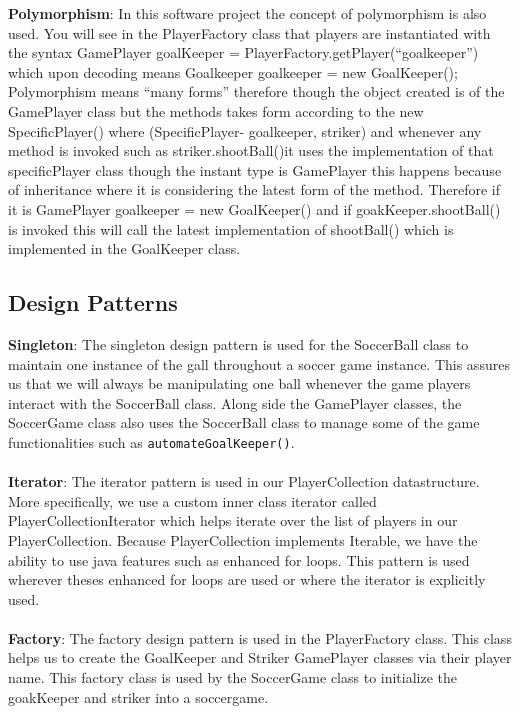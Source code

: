 \documentclass[12pt, dvipsnames, a4paper]{article}
\newcommand{\code}[1]{\texttt{#1}}
\begin{document}
\textbf{Polymorphism}: In this software project the concept of polymorphism is also used. You will see in the PlayerFactory class that
players are instantiated with the syntax GamePlayer goalKeeper = PlayerFactory.getPlayer(“goalkeeper”) which upon decoding means Goalkeeper goalkeeper = new GoalKeeper();
Polymorphism means “many forms” therefore though the object created is of the GamePlayer class but the methods takes form according to the
new SpecificPlayer() where (SpecificPlayer- goalkeeper, striker) and whenever any method is invoked such as striker.shootBall()it uses the implementation
of that specificPlayer class though the instant type is GamePlayer this happens because of inheritance where it is considering the latest form of the method.
Therefore if it is GamePlayer goalkeeper =  new GoalKeeper() and if goakKeeper.shootBall() is invoked this will call the
latest implementation of shootBall() which is implemented in the GoalKeeper class.

\subsection{Design Patterns}
\textbf{Singleton}: The singleton design pattern is used for the SoccerBall class to maintain one instance of the
gall throughout a soccer game instance. This assures us that we will always be manipulating one ball
whenever the game players interact with the SoccerBall class. Along side the GamePlayer classes, the SoccerGame class
also uses the SoccerBall class to manage some of the game functionalities such as \code{automateGoalKeeper()}. \\ \\
\textbf{Iterator}: The iterator pattern is used in our PlayerCollection datastructure. More specifically, we use a custom inner class
iterator called PlayerCollectionIterator which helps iterate over the list of players in our PlayerCollection. Because PlayerCollection
implements Iterable, we have the ability to use java features such as enhanced for loops. This
pattern is used wherever theses enhanced for loops are used or where the iterator is explicitly used. \\ \\
\textbf{Factory}: The factory design pattern is used in the PlayerFactory class. This class
helps us to create the GoalKeeper and Striker GamePlayer classes via their player name. This factory class
is used by the SoccerGame class to initialize the goakKeeper and striker into a soccergame.
\clearpage
\end{document}
